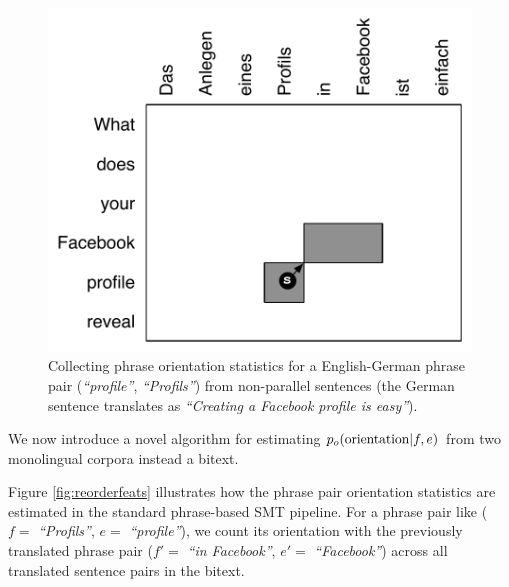 \documentclass[11pt,letterpaper]{article}
\newcommand{\todo}[1]{\textcolor{red}{TODO: #1}}
\newcommand{\emq}[1]{\emph{``#1''}}
\begin{document}
\begin{figure}[t]
\begin{center}
\includegraphics[width=0.8 \linewidth]{../figures/monoreord/monoreord.pdf}
\caption{Collecting phrase orientation statistics for a English-German phrase pair (\emq{profile}, \emq{Profils}) from non-parallel sentences (the German sentence translates as  \emq{Creating a Facebook profile is easy}). %
}
\label{fig:monoreord}
\end{center}
\vskip -0.2in
\end{figure}

We now introduce a novel algorithm for estimating $p_o(\textnormal{orientation}|f,e)$ from two monolingual corpora instead a bitext.

Figure \ref{fig:reorderfeats} illustrates how the phrase pair orientation statistics are estimated in the standard phrase-based SMT pipeline.  For a phrase pair like ($f =$ \emq{Profils}, $e =$ \emq{profile}), we count its orientation with the previously translated phrase pair ($f' =$ \emq{in Facebook}, $e' =$ \emq{Facebook}) across all translated sentence pairs in the bitext.  
\end{document}
